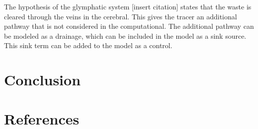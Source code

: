 \documentclass[11pt,a4paper]{article}
\begin{document}
The hypothesis of the glymphatic system [insert citation] states that the waste is cleared through the veins in the cerebral. This gives the tracer an additional pathway that is not considered in the computational. The additional pathway can be modeled as a drainage, which can be included in the model as a sink source. This sink term can be added to the model as a control. 




 
\section{Conclusion}



%
%
% 
% 
% 
%
% 
\section{References}




\end{document}
